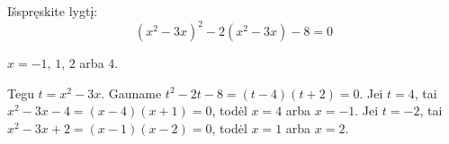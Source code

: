 \begin{salyga}
Išspręskite lygtį:
    \[ (x^2 - 3x)^2 - 2(x^2 - 3x) - 8 = 0 \]
\end{salyga}

\begin{atsakymas}
$x=-1$, $1$, $2$ arba $4$.
\end{atsakymas}

\begin{sprendimas}
Tegu $t=x^2-3x$. Gauname $t^2-2t-8=(t-4)(t+2)=0$.
Jei $t=4$, tai $x^2-3x-4=(x-4)(x+1)=0$, todėl $x=4$ arba $x=-1$.
Jei $t=-2$, tai $x^2-3x+2=(x-1)(x-2)=0$, todėl $x=1$ arba $x=2$.
\end{sprendimas}
